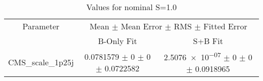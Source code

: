 \begin{table}
\centering
\caption{Values for nominal S=1.0}
\begin{tabular}{ccc}
\toprule
Parameter & \multicolumn{2}{c}{Mean $\pm$ Mean Error $\pm$ RMS $\pm$ Fitted Error}\\
 & B-Only Fit & S+B Fit\\
\midrule
CMS\_scale\_1p25j & \num{0.0781579} $\pm$ \num{0} $\pm$ \num{0} $\pm$ \num{0.0722582} & \num{2.5076e-07} $\pm$ \num{0} $\pm$ \num{0} $\pm$ \num{0.0918965}\\
\bottomrule
\end{tabular}
\end{table}